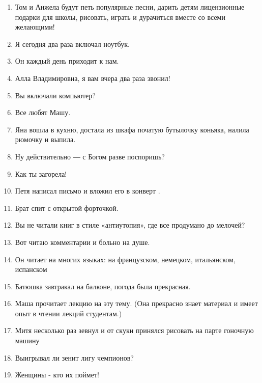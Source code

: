 \documentclass[paper=a4, fontsize=11pt]{scrartcl}
\begin{document}
\begin{enumerate}
    \item Том и Анжела будут петь популярные песни, дарить детям лицензионные подарки для школы, рисовать, играть и дурачиться вместе со всеми желающими!
    \item Я сегодня два раза включал ноутбук.
    \item Он каждый день приходит к нам.
    \item Алла Владимировна, я вам вчера два раза звонил!
    \item Вы включали компьютер?
    \item Все любят Машу.
    \item Яна вошла в кухню, достала из шкафа початую бутылочку коньяка, налила рюмочку и выпила.
    \item Ну действительно ― с Богом разве поспоришь?
    \item Как ты загорела!
    \item Петя написал письмо и вложил его в конверт .
    \item Брат спит с открытой форточкой.
    \item Вы не читали книг в стиле «антиутопия», где все продумано до мелочей? 
    \item Вот читаю комментарии и больно на душе.
    \item Он читает на многих языках: на французском, немецком, итальянском, испанском
    \item Батюшка завтракал на балконе, погода была прекрасная.
    \item Маша прочитает лекцию на эту тему. (Она прекрасно знает материал и имеет опыт в чтении лекций студентам.)
    \item Митя несколько раз зевнул и от скуки принялся рисовать на парте гоночную машину
    \item Выигрывал ли зенит лигу чемпионов?
    \item Женщины - кто их поймет!
\end{enumerate}
\end{document}
